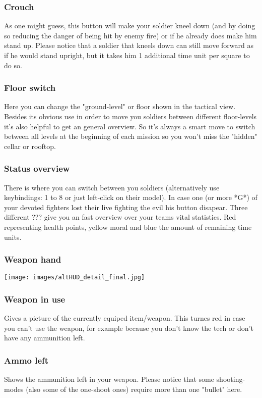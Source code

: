 \subsubsection{Crouch}
As one might guess, this button will make your soldier kneel down (and by doing so reducing the danger of being hit by enemy fire) or if he already does make him stand up. Please notice that a soldier that kneels down can still move forward as if he would stand upright, but it takes him 1 additional time unit per square to do so.
\subsubsection{Floor switch}
Here you can change the "ground-level" or floor shown in the tactical view. Besides its obvious use in order to move you soldiers between different floor-levels it's also helpful to get an general overview. So it's always a smart move to switch between all levels at the beginning of each mission so you won't miss the "hidden" cellar or rooftop.
\subsubsection{Status overview}
There is where you can switch between you soldiers (alternatively use keybindings: 1 to 8 or just left-click on their model). In case one (or more *G*) of your devoted fighters lost their live fighting the evil his button disapear. Three different ??? give you an fast overview over your teams vital statistics. Red representing health points, yellow moral and blue the amount of remaining time units.
\subsubsection{Weapon hand}
\texttt{[image: images/altHUD\_detail\_final.jpg]}

\subsubsection{Weapon in use}
Gives a picture of the currently equiped item/weapon. This turnes red in case you can't use the weapon, for example because you don't know the tech or don't have any ammunition left.
\subsubsection{Ammo left}
Shows the ammunition left in your weapon. Please notice that some shooting-modes (also some of the one-shoot ones) require more than one "bullet" here.
